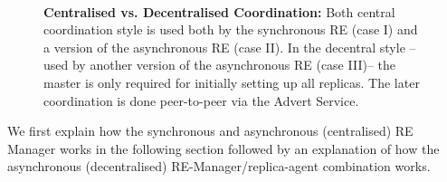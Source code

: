 \documentclass{rspublic}
\newcommand{\jhanote}[1]{ {\textcolor{red} { ***shantenu: #1 }}}
\newcommand{\alnote}[1]{ {\textcolor{blue} { ***andre: #1 }}}
\newcommand{\alnote}[1]{}
\newcommand{\jhanote}[1]{}
\begin{document}

\begin{figure}%
\centering
{}\qquad
{}\\
\caption{\textbf{Centralised vs. Decentralised Coordination:} Both
  central coordination style is used both by the synchronous RE (case
  I) and a version of the asynchronous RE (case II).  In the decentral
  style -- used by another version of the asynchronous RE (case III)--
  the master is only required for initially setting up all
  replicas. The later coordination is done peer-to-peer via the Advert
  Service.}
\label{fig:coordination}
\end{figure}


We first explain how the synchronous and asynchronous (centralised) RE
Manager works in the following section followed by an explanation of
how the asynchronous (decentralised) RE-Manager/replica-agent
combination works.
\end{document}

